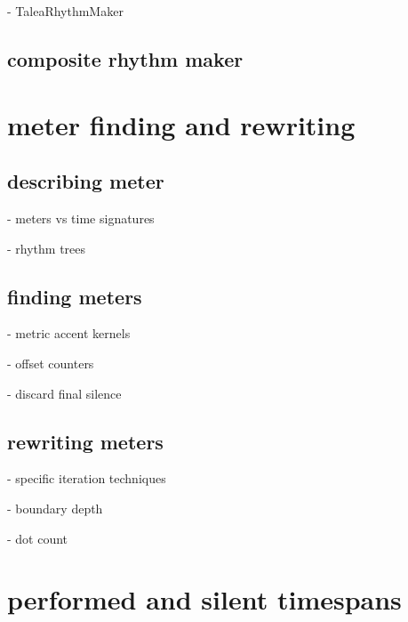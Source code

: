 - TaleaRhythmMaker

\begin{comment}
<abjad>
talea_rhythm_maker = rhythmmakertools.TaleaRhythmMaker(
    talea=rhythmmakertools.Talea(
        counts=[1, 2, 3, 4],
        denominator=16,
        ),
    )
show(talea_rhythm_maker, divisions=divisions)
</abjad>
\end{comment}

\subsection{composite rhythm maker}

\begin{comment}
<abjad>
composite_rhythm_maker = consort.CompositeRhythmMaker(
    default=note_rhythm_maker,
    last=incised_rhythm_maker,
    first=even_division_rhythm_maker,
    )
</abjad>
\end{comment}

\section{meter finding and rewriting}

\subsection{describing meter}

- meters vs time signatures

- rhythm trees

\subsection{finding meters}

- metric accent kernels

- offset counters

- discard final silence

\subsection{rewriting meters}

- specific iteration techniques

- boundary depth

- dot count

\section{performed and silent timespans}

